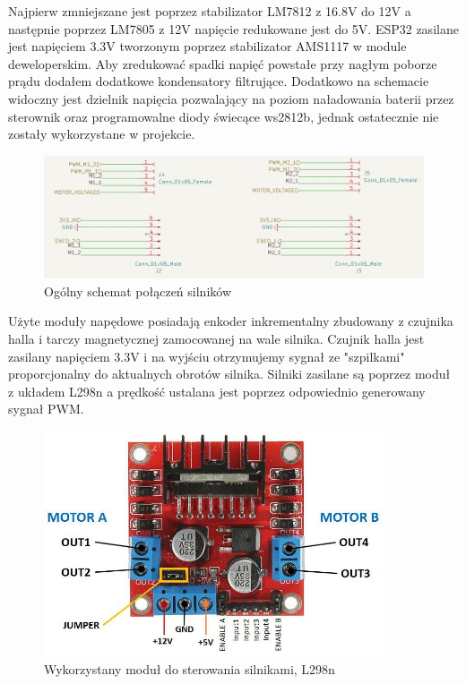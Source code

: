 Najpierw zmniejszane jest poprzez stabilizator LM7812 z 16.8V do 12V a następnie poprzez LM7805 z 12V napięcie redukowane jest do 5V. 
ESP32 zasilane jest napięciem 3.3V tworzonym poprzez stabilizator AMS1117 w module deweloperskim. 
Aby zredukować spadki napięć powstałe przy nagłym poborze prądu dodałem dodatkowe kondensatory filtrujące. 
Dodatkowo na schemacie widoczny jest dzielnik napięcia pozwalający na poziom naładowania baterii przez sterownik oraz programowalne diody świecące ws2812b,
jednak ostatecznie nie zostały wykorzystane w projekcie.
\begin{figure}[H]
	\centering
	\includegraphics[width=16cm]{pages/robot/zdjecia/kicad/schematSilniki.png}
	\caption{Ogólny schemat połączeń silników}
	\label{Fig:Rysunek}
\end{figure}
Użyte moduły napędowe posiadają enkoder inkrementalny zbudowany z czujnika halla i tarczy magnetycznej zamocowanej na wale silnika.
Czujnik halla jest zasilany napięciem 3.3V i na wyjściu otrzymujemy sygnał ze "szpilkami" proporcjonalny do aktualnych obrotów silnika. 
Silniki zasilane są poprzez moduł z układem L298n a prędkość ustalana jest poprzez odpowiednio generowany sygnał PWM. 
\begin{figure}[H]
	\centering
	\includegraphics[width=10cm]{pages/robot/zdjecia/l298n_modul.jpg}
	\caption{Wykorzystany moduł do sterowania silnikami, L298n}
	\label{Fig:Rysunek}
\end{figure}
